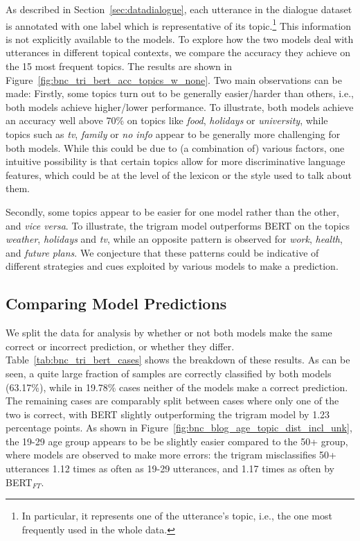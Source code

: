 As described in Section~\ref{sec:datadialogue}, each utterance in the dialogue dataset is annotated with one label which is representative of its topic.\footnote{In particular, it represents one of the utterance's topic, i.e., the one most frequently used in the whole data.} This information is not explicitly available to the models.
To explore how the two models deal with utterances in different topical contexts, we compare the accuracy they achieve on the 15 most frequent topics. The results are shown in Figure~\ref{fig:bnc_tri_bert_acc_topics_w_none}. Two main observations can be made: Firstly, some topics turn out to be generally easier/harder than others, i.e., both models achieve higher/lower performance. To illustrate, both models achieve an accuracy well above 70\% on topics like \emph{food}, \emph{holidays} or \emph{university}, while topics such as \emph{tv}, \emph{family} or \emph{no info} appear to be generally more challenging for both models. While this could be due to (a combination of) various factors, one intuitive possibility is that certain topics allow for more discriminative language features, which could be at the level of the lexicon or the style used to talk about them.

Secondly, some topics appear to be easier for one model rather than the other, and \emph{vice versa}. To illustrate, the trigram model outperforms BERT on the topics \emph{weather}, \emph{holidays} and \emph{tv}, while an opposite pattern is observed for \emph{work}, \emph{health}, and \emph{future plans}. We conjecture that these patterns could be indicative of different strategies and cues exploited by various models to make a prediction. 

\subsection{Comparing Model Predictions}
We split the data for analysis by whether or not both models make the same correct or incorrect prediction, or whether they differ. Table~\ref{tab:bnc_tri_bert_cases} shows the breakdown of these results.
As can be seen, a quite large fraction of samples are correctly classified by both models (63.17\%), while in 19.78\% cases neither of the models make a correct prediction. The remaining cases are comparably split between cases where only one of the two is correct, with BERT slightly outperforming the trigram model by 1.23 percentage points. %
As shown in Figure~\ref{fig:bnc_blog_age_topic_dist_incl_unk}, the 19-29 age group appears to be be slightly easier compared to the 50+ group, where models are observed to make more errors: the trigram misclassifies 50+ utterances 1.12 times as often as 19-29 utterances, and 1.17 times as often by BERT$_{FT}$.


